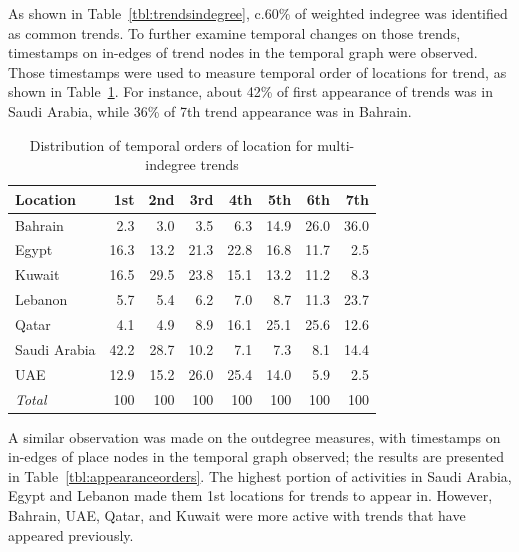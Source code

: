 \documentclass{llncs}
\begin{document}
As shown in Table~\ref{tbl:trendsindegree}, c.60\% of weighted
indegree was identified as common trends. To further examine temporal
changes on those trends, timestamps on in-edges of trend nodes in the
temporal graph were observed. Those timestamps were used to measure
temporal order of locations for trend, as shown in
Table~\ref{tbl:temporders}. For instance, about 42\% of first
appearance of trends was in Saudi Arabia, while 36\% of 7th trend
appearance was in Bahrain.

\begin{table}[!h]
\centering
\caption{Distribution of temporal orders of location for multi-indegree trends}
\begin{tabular}{@{}lrrrrrrr@{}}
\toprule
Location & 1st & 2nd & 3rd & 4th & 5th & 6th & 7th \\ 
\midrule
Bahrain &          2.3 &    3.0 &    3.5 &  6.3 & 14.9 & 26.0 & 36.0 \\
Egypt &            16.3 & 13.2 & 21.3 & 22.8 & 16.8 & 11.7 &   2.5 \\
Kuwait &          16.5 & 29.5 & 23.8 & 15.1 & 13.2 & 11.2 &   8.3\\
Lebanon &         5.7 &   5.4 &   6.2 &   7.0 &   8.7 & 11.3 & 23.7 \\
Qatar &              4.1 &   4.9 &   8.9 & 16.1 & 25.1 & 25.6 & 12.6 \\
Saudi Arabia & 42.2 & 28.7 & 10.2 &   7.1 &   7.3 &   8.1 & 14.4 \\
UAE &              12.9 & 15.2 & 26.0 & 25.4 & 14.0 &   5.9 &   2.5\\
\midrule
{\emph{Total}} & 100 & 100 & 100 & 100 & 100 &  100 &   100\\
\bottomrule
\end{tabular}
\label{tbl:temporders}
\end{table}

A similar observation was made on the outdegree measures, with
timestamps on in-edges of place nodes in the temporal graph observed;
the results are presented in Table~\ref{tbl:appearanceorders}. The
highest portion of activities in Saudi Arabia, Egypt and Lebanon made
them 1st locations for trends to appear in. However, Bahrain, UAE, Qatar,
and Kuwait were more active with trends that have appeared previously.
\end{document}
